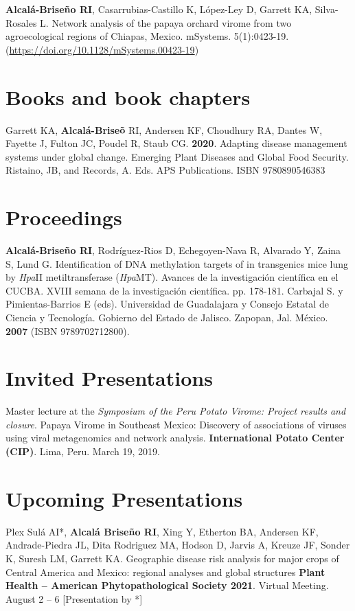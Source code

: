 \documentclass[margin,line]{res}
\begin{document}
\begin{resume}
{\bf Alcal\'a-Brise\~no RI}, Casarrubias-Castillo K, L\'opez-Ley D, Garrett KA, Silva-Rosales L. Network analysis of the papaya orchard virome from two agroecological regions of Chiapas, Mexico. mSystems. 5(1):0423-19. (\url{https://doi.org/10.1128/mSystems.00423-19})


\section{\sc Books and book chapters}

Garrett KA, {\bf Alcal\'a-Brise\~o} RI, Andersen KF, Choudhury RA, Dantes W, Fayette J, Fulton JC, Poudel R, Staub CG. {\bf2020}. Adapting disease management systems under global change. Emerging Plant Diseases and Global Food Security. Ristaino, JB, and Records, A. Eds. APS Publications. ISBN 9780890546383
 
\section{\sc Proceedings}
{\bf Alcal\'a-Brise\~no RI}, Rodr\'iguez-Rios D, Echegoyen-Nava R, Alvarado Y, Zaina S, Lund G. Identification of DNA methylation targets of in transgenics mice lung by {\it Hpa}II metiltransferase ({\it Hpa}MT). Avances de la investigaci\'on cient\'ifica en el CUCBA. XVIII semana de la investigaci\'on cient\'ifica. pp. 178-181. Carbajal S. y Pimientas-Barrios E (eds). Universidad de Guadalajara y Consejo Estatal de Ciencia y Tecnolog\'ia. Gobierno del Estado de Jalisco. Zapopan, Jal. M\'exico. {\bf 2007} (ISBN 9789702712800).

\section{\sc Invited Presentations}
\vspace{.05cm}
Master lecture at the {\em Symposium of the Peru Potato Virome: Project results and closure}. Papaya Virome in Southeast Mexico: Discovery of associations of viruses using viral metagenomics and network analysis. {\bf International Potato Center (CIP)}. Lima, Peru. March 19, 2019.

\section{\sc  Upcoming Presentations}
\vspace{1cm}

Plex Sul\'a AI*,  {\bf Alcal\'a Brise\~no RI},   Xing Y,  Etherton BA, Andersen KF,  Andrade-Piedra JL, Dita Rodriguez MA, Hodson D, Jarvis A, Kreuze JF,  Sonder K, Suresh  LM, Garrett KA. Geographic disease risk analysis for major crops of Central America and Mexico: regional analyses and global structures  {\bf Plant Health -- American Phytopathological Society  2021}. Virtual Meeting. August 2 -- 6 [Presentation by *] \vspace{.05cm}


\end{resume}
\end{document}
